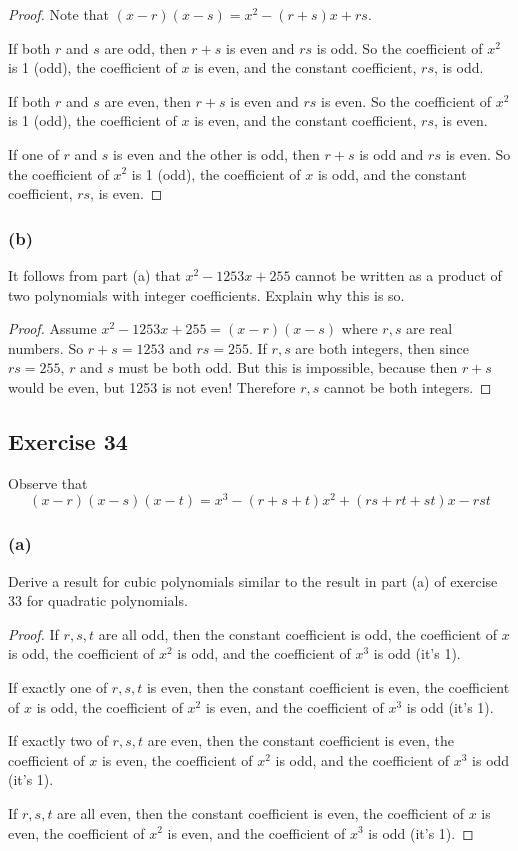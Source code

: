 \documentclass[14pt]{extarticle}
\begin{document}
\begin{proof}
    Note that $(x - r)(x - s) = x^2 - (r + s)x + rs$.

    If both $r$ and $s$ are odd, then $r + s$ is even and $rs$ is odd. So the coefficient of $x^2$ is 1 (odd), the coefficient of $x$ is even, and the constant coefficient, $rs$, is odd.

    If both $r$ and $s$ are even, then $r + s$ is even and $rs$ is even. So the coefficient of $x^2$ is 1 (odd), the coefficient of $x$ is even, and the constant coefficient, $rs$, is even.

    If one of $r$ and $s$ is even and the other is odd, then $r + s$ is odd and $rs$ is even. So the coefficient of $x^2$ is 1 (odd), the coefficient of $x$ is odd, and the constant coefficient, $rs$, is even.
\end{proof}

\subsubsection{(b)}
It follows from part (a) that $x^2 - 1253x + 255$ cannot be written as a product of two polynomials with integer coefficients. Explain why this is so.

\begin{proof}
    Assume $x^2 - 1253x + 255 = (x-r)(x-s)$ where $r,s$ are real numbers. So $r+s = 1253$ and $rs = 255$. If $r,s$ are both integers, then since $rs = 255$, $r$ and $s$ must be both odd. But this is impossible, because then $r+s$ would be even, but 1253 is not even! Therefore $r,s$ cannot be both integers.
\end{proof}

\subsection{Exercise 34}
Observe that
\[
    (x-r)(x-s)(x-t) = x^3 - (r+s+t)x^2 + (rs+rt+st)x - rst
\]
\subsubsection{(a)}
Derive a result for cubic polynomials similar to the result in part (a) of exercise 33 for quadratic polynomials.

\begin{proof}
    If $r,s,t$ are all odd, then the constant coefficient is odd, the coefficient of $x$ is odd, the coefficient of $x^2$ is odd, and the coefficient of $x^3$ is odd (it's 1).

    If exactly one of $r,s,t$ is even, then the constant coefficient is even, the coefficient of $x$ is odd, the coefficient of $x^2$ is even, and the coefficient of $x^3$ is odd (it's 1).

    If exactly two of $r,s,t$ are even, then the constant coefficient is even, the coefficient of $x$ is even, the coefficient of $x^2$ is odd, and the coefficient of $x^3$ is odd (it's 1).

    If $r,s,t$ are all even, then the constant coefficient is even, the coefficient of $x$ is even, the coefficient of $x^2$ is even, and the coefficient of $x^3$ is odd (it's 1).
\end{proof}
\end{document}
